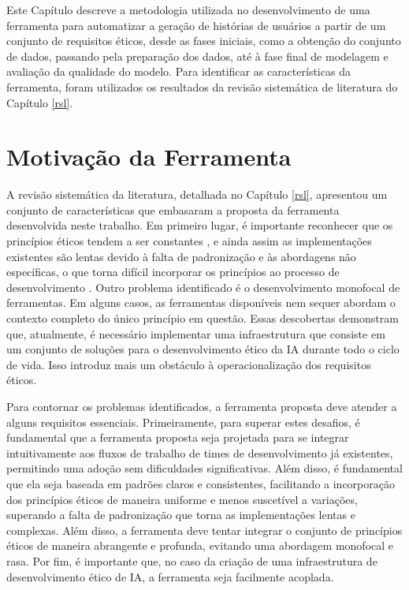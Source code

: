 \label{ferramenta}

Este Capítulo descreve a metodologia utilizada no desenvolvimento de uma ferramenta para automatizar a geração de histórias de usuários a partir de um conjunto de requisitos éticos, desde as fases iniciais, como a obtenção do conjunto de dados, passando pela preparação dos dados, até à fase final de modelagem e avaliação da qualidade do modelo. Para identificar as características da ferramenta, foram utilizados os resultados da revisão sistemática de literatura do Capítulo \ref{rsl}.

\section{Motivação da Ferramenta}
A revisão sistemática da literatura, detalhada no Capítulo \ref{rsl}, apresentou um conjunto de características que embasaram a proposta da ferramenta desenvolvida neste trabalho. Em primeiro lugar, é importante reconhecer que os princípios éticos tendem a ser constantes \cite{rees-muller, khan, balasubramaniam}, e ainda assim as implementações existentes são lentas devido à falta de padronização e às abordagens não específicas, o que torna difícil incorporar os princípios ao processo de desenvolvimento \cite{khan, kemell, agbese, correa}. Outro problema identificado é o desenvolvimento monofocal de ferramentas. Em alguns casos, as ferramentas disponíveis nem sequer abordam o contexto completo do único princípio em questão. Essas descobertas demonstram que, atualmente, é necessário implementar uma infraestrutura que consiste em um conjunto de soluções para o desenvolvimento ético da IA durante todo o ciclo de vida. Isso introduz mais um obstáculo à operacionalização dos requisitos éticos. 

Para contornar os problemas identificados, a ferramenta proposta deve atender a alguns requisitos essenciais. Primeiramente, para superar estes desafios, é fundamental que a ferramenta proposta seja projetada para se integrar intuitivamente aos fluxos de trabalho de times de desenvolvimento já existentes, permitindo uma adoção sem dificuldades significativas. Além disso, é fundamental que ela seja baseada em padrões claros e consistentes, facilitando a incorporação dos princípios éticos de maneira uniforme e menos suscetível a variações, superando a falta de padronização que torna as implementações lentas e complexas. Além disso, a ferramenta deve tentar integrar o conjunto de princípios éticos de maneira abrangente e profunda, evitando uma abordagem monofocal e rasa. Por fim, é importante que, no caso da criação de uma infraestrutura de desenvolvimento ético de \acrshort{IA}, a ferramenta seja facilmente acoplada.

